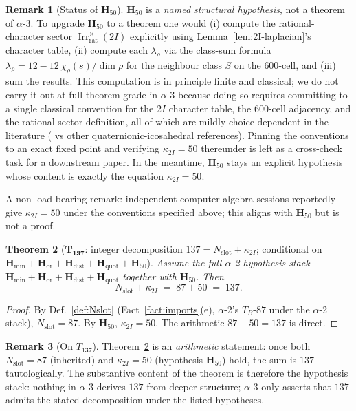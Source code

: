 \documentclass[11pt, a4paper]{amsart}
\newtheorem{theorem}{Theorem}[section]
\theoremstyle{definition}
\newtheorem{remark}[theorem]{Remark}
\newcommand{\Irr}{\operatorname{Irr}}
\newcommand{\Hmin}{\mathbf{H}_{\min}}
\newcommand{\Hor}{\mathbf{H}_{\mathrm{or}}}
\newcommand{\Hdist}{\mathbf{H}_{\mathrm{dist}}}
\newcommand{\Hquot}{\mathbf{H}_{\mathrm{quot}}}
\newcommand{\Hfifty}{\mathbf{H}_{50}}
\newcommand{\Nslot}{N_{\mathrm{slot}}}
\newcommand{\kappaTwoI}{\kappa_{2I}}
\newcommand{\Irrrat}{\Irr_{\mathrm{rat}}}
\begin{document}
\begin{remark}[Status of $\Hfifty$]
\label{rmk:H50-status}
$\Hfifty$ is a \emph{named structural hypothesis}, not a
theorem of $\alpha$-3. To upgrade $\Hfifty$ to a theorem one
would (i) compute the rational-character sector
$\Irrrat^\times(2I)$ explicitly using
Lemma~\ref{lem:2I-laplacian}'s character table, (ii) compute
each $\lambda_\rho$ via the class-sum formula
$\lambda_\rho = 12 - 12\,\chi_\rho(s)/\dim\rho$ for the
neighbour class $S$ on the $600$-cell, and (iii) sum the
results. This computation is in principle finite and
classical; we do not carry it out at full theorem grade in
$\alpha$-3 because doing so requires committing to a single
classical convention for the $2I$ character table, the
$600$-cell adjacency, and the rational-sector definition,
all of which are mildly choice-dependent in the literature
(\cite{DuVal} vs other quaternionic-icosahedral
references). Pinning the conventions to an exact fixed
point and verifying $\kappaTwoI = 50$ thereunder is left
as a cross-check task for a downstream paper. In the
meantime, $\Hfifty$ stays an explicit hypothesis whose
content is exactly the equation $\kappaTwoI = 50$.

A non-load-bearing remark: independent computer-algebra
sessions reportedly give $\kappaTwoI = 50$ under the
conventions specified above; this aligns with $\Hfifty$ but
is not a proof.
\end{remark}

\begin{theorem}[$\mathbf{T_{137}}$: integer decomposition
  $137 = \Nslot + \kappaTwoI$;
  conditional on $\Hmin + \Hor + \Hdist + \Hquot + \Hfifty$]
\label{thm:T137}
Assume the full $\alpha$-2 hypothesis stack
$\Hmin + \Hor + \Hdist + \Hquot$ together with $\Hfifty$.
Then
\[
  \Nslot + \kappaTwoI \;=\; 87 + 50 \;=\; 137.
\]
\end{theorem}

\begin{proof}
By Def.~\ref{def:Nslot} (Fact~\ref{fact:imports}(e),
$\alpha$-2's $T_B$-$87$ under the $\alpha$-2 stack),
$\Nslot = 87$. By $\Hfifty$, $\kappaTwoI = 50$. The
arithmetic $87 + 50 = 137$ is direct.
\end{proof}

\begin{remark}[On $T_{137}$]
\label{rmk:T137-status}
Theorem~\ref{thm:T137} is an \emph{arithmetic} statement:
once both $\Nslot = 87$ (inherited) and $\kappaTwoI = 50$
(hypothesis $\Hfifty$) hold, the sum is $137$ tautologically.
The substantive content of the theorem is therefore the
hypothesis stack: nothing in $\alpha$-3 derives $137$ from
deeper structure; $\alpha$-3 only asserts that $137$ admits
the stated decomposition under the listed hypotheses.
\end{remark}
\end{document}

